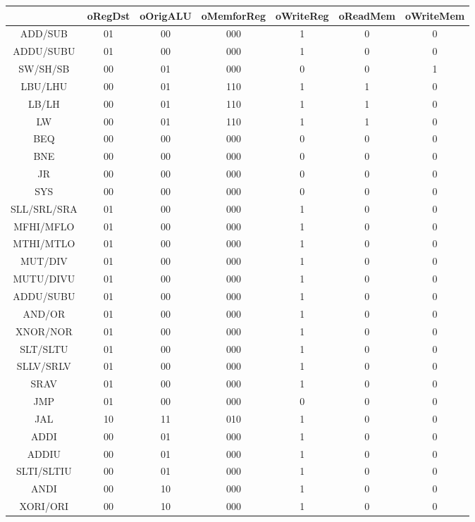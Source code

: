 \documentclass[12pt]{article}
\begin{document}
\begin{longtable}{|c|c|c|c|c|c|c|}
		\hline
		 & oRegDst & oOrigALU & oMemforReg & oWriteReg & oReadMem & oWriteMem\\\hline
		 ADD/SUB & 01 & 00 & 000 & 1 & 0 & 0\\\hline	
		 ADDU/SUBU & 01 & 00 & 000 & 1 & 0 & 0\\\hline
		 SW/SH/SB & 00 & 01 & 000 & 0 & 0 & 1\\\hline
		 LBU/LHU & 00 & 01 & 110 & 1 & 1 & 0\\\hline
		 LB/LH & 00 & 01 & 110 & 1 & 1 & 0\\\hline
		 LW & 00 & 01 & 110 & 1 & 1 & 0\\\hline
		 BEQ & 00 & 00 & 000 & 0 & 0 & 0\\\hline	
		 BNE & 00 & 00 & 000 & 0 & 0 & 0\\\hline
		 JR & 00 & 00 & 000 & 0 & 0 & 0\\\hline
		 SYS & 00 & 00 & 000 & 0 & 0 & 0\\\hline
		 SLL/SRL/SRA & 01 & 00 & 000 & 1 & 0 & 0\\\hline
		 MFHI/MFLO & 01 & 00 & 000 & 1 & 0 & 0\\\hline
		 MTHI/MTLO & 01 & 00 & 000 & 1 & 0 & 0\\\hline
		 MUT/DIV & 01 & 00 & 000 & 1 & 0 & 0\\\hline
		 MUTU/DIVU & 01 & 00 & 000 & 1 & 0 & 0\\\hline
		 ADDU/SUBU & 01 & 00 & 000 & 1 & 0 & 0\\\hline
		 AND/OR & 01 & 00 & 000 & 1 & 0 & 0\\\hline
		 XNOR/NOR & 01 & 00 & 000 & 1 & 0 & 0\\\hline
		 SLT/SLTU & 01 & 00 & 000 & 1 & 0 & 0\\\hline
		 SLLV/SRLV & 01 & 00 & 000 & 1 & 0 & 0\\\hline
		 SRAV & 01 & 00 & 000 & 1 & 0 & 0\\\hline	
		 JMP & 01 & 00 & 000 & 0 & 0 & 0\\\hline
		 JAL & 10 & 11 & 010 & 1 & 0 & 0\\\hline
		 ADDI & 00 & 01 & 000 & 1 & 0 & 0\\\hline
		 ADDIU & 00 & 01 & 000 & 1 & 0 & 0\\\hline
		 SLTI/SLTIU & 00 & 01 & 000 & 1 & 0 & 0\\\hline
		 ANDI & 00 & 10 & 000 & 1 & 0 & 0\\\hline
		 XORI/ORI & 00 & 10 & 000 & 1 & 0 & 0\\\hline

\end{longtable}
\end{document}
